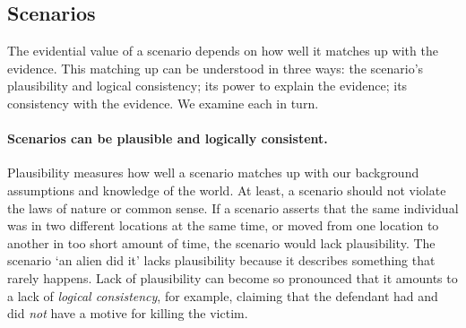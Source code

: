 \documentclass[10pt]{article}
\begin{document}

\subsection{Scenarios}

The evidential value of a scenario depends on how well it matches up with the evidence. 
This matching up can be understood in three ways: the scenario's plausibility and logical consistency; its power to explain the evidence; 
its consistency with the evidence. We examine each in turn. 


\paragraph{Scenarios can be plausible and logically consistent.}

Plausibility measures how well a scenario matches up with 
our background assumptions and knowledge of the world. %
At least, a scenario should not violate the laws of nature or common sense. If a scenario asserts that the same individual was in two different locations 
at the same time, or moved from one location to another in too short amount of time, the scenario would lack plausibility. 
The scenario `an alien did it' lacks plausibility because it describes something that rarely happens. 
Lack of plausibility can become so pronounced that it amounts to a lack of \textit{logical consistency}, for example, claiming that 
 the defendant had and did \textit{not} have a motive for killing the victim.
 
\end{document}
